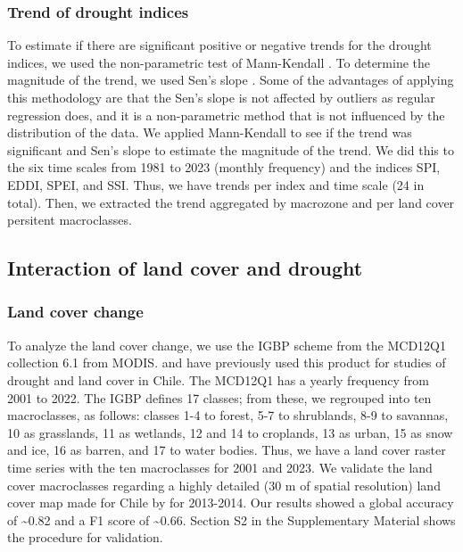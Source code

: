 \documentclass[
  authoryear,
  preprint,
  3p,
  onecolumn]{elsarticle}
\begin{document}
\hypertarget{trend-of-drought-indices}{%
\subsubsection{Trend of drought
indices}\label{trend-of-drought-indices}}

To estimate if there are significant positive or negative trends for the
drought indices, we used the non-parametric test of Mann-Kendall
\citep{Kendall1975}. To determine the magnitude of the trend, we used
Sen's slope \citep{Sen1968}. Some of the advantages of applying this
methodology are that the Sen's slope is not affected by outliers as
regular regression does, and it is a non-parametric method that is not
influenced by the distribution of the data. We applied Mann-Kendall to
see if the trend was significant and Sen's slope to estimate the
magnitude of the trend. We did this to the six time scales from 1981 to
2023 (monthly frequency) and the indices SPI, EDDI, SPEI, and SSI. Thus,
we have trends per index and time scale (24 in total). Then, we
extracted the trend aggregated by macrozone and per land cover persitent
macroclasses.

\hypertarget{interaction-of-land-cover-and-drought}{%
\subsection{Interaction of land cover and
drought}\label{interaction-of-land-cover-and-drought}}

\hypertarget{land-cover-change}{%
\subsubsection{Land cover change}\label{land-cover-change}}

To analyze the land cover change, we use the IGBP scheme from the
MCD12Q1 collection 6.1 from MODIS. \citet{Zambrano2018} and
\citet{Fuentes2021} have previously used this product for studies of
drought and land cover in Chile. The MCD12Q1 has a yearly frequency from
2001 to 2022. The IGBP defines 17 classes; from these, we regrouped into
ten macroclasses, as follows: classes 1-4 to forest, 5-7 to shrublands,
8-9 to savannas, 10 as grasslands, 11 as wetlands, 12 and 14 to
croplands, 13 as urban, 15 as snow and ice, 16 as barren, and 17 to
water bodies. Thus, we have a land cover raster time series with the ten
macroclasses for 2001 and 2023. We validate the land cover macroclasses
regarding a highly detailed (30 m of spatial resolution) land cover map
made for Chile by \citet{Zhao2016} for 2013-2014. Our results showed a
global accuracy of \textasciitilde0.82 and a F1 score of
\textasciitilde0.66. Section S2 in the Supplementary Material shows the
procedure for validation.
\end{document}
